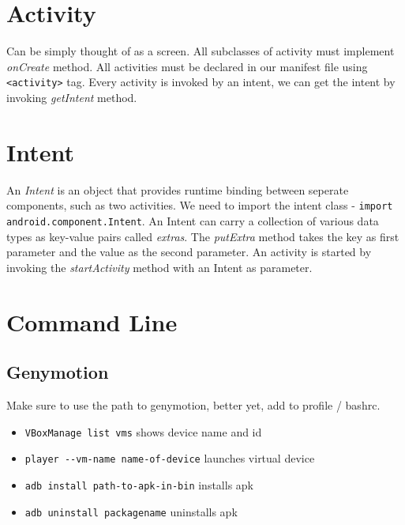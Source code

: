 \documentclass[a4paper, 12pt]{article}
\begin{document}
\section{Activity}
Can be simply thought of as a screen. All subclasses of activity must implement \emph{onCreate} method. All activities must be declared in our manifest file using \verb|<activity>| tag. Every activity is invoked by an intent, we can get the intent by invoking \emph{getIntent} method.

\section{Intent}
An \emph{Intent} is an object that provides runtime binding between seperate components, such as two activities. We need to import the intent class - \verb|import android.component.Intent|. An Intent can carry a collection of various data types as key-value pairs called \emph{extras}. The \emph{putExtra} method takes the key as first parameter and the value as the second parameter. An activity is started by invoking the \emph{startActivity} method with an Intent as parameter.

\section{Command Line}
\subsection{Genymotion}
Make sure to use the path to genymotion, better yet, add to profile / bashrc.
\begin{itemize}
	\item \verb|VBoxManage list vms| shows device name and id
	\item \verb|player --vm-name name-of-device| launches virtual device
	\item \verb|adb install path-to-apk-in-bin| installs apk
	\item \verb|adb uninstall packagename| uninstalls apk
\end{itemize}
\end{document}
